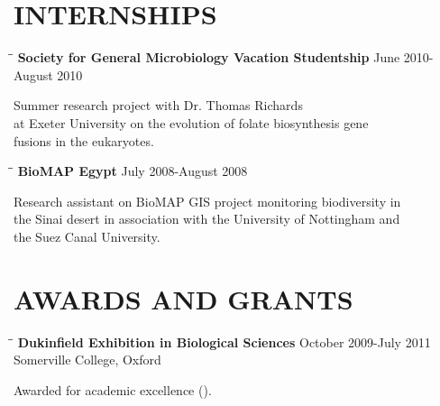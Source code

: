 \documentclass{res}
\begin{document}
\begin{resume}
\section{INTERNSHIPS}
   \vspace{-0.05in}  
      \begin{tabbing}
   \hspace{2in}\= \hspace{2.6in}\= \kill 
    {\bf Society for General Microbiology Vacation Studentship} \> \>        June 2010-August 2010\\
     \end{tabbing}\vspace{-30pt}      
Summer research project with Dr. Thomas Richards \\  at Exeter University on the evolution of folate biosynthesis gene \\fusions in the eukaryotes.

   \begin{tabbing}
   \hspace{2in}\= \hspace{2.6in}\= \kill 
    {\bf BioMAP Egypt} \> \>        July 2008-August 2008\\
     \end{tabbing}\vspace{-30pt}      
Research assistant on BioMAP GIS project monitoring biodiversity in \\the Sinai desert in association with the University of Nottingham and \\the Suez Canal University.

\section{AWARDS AND GRANTS}
   \vspace{-0.05in}  
   \begin{tabbing}
   \hspace{2in}\= \hspace{2.6in}\= \kill 
    {\bf Dukinfield Exhibition in Biological Sciences} \> \>        October 2009-July 2011\\
                                               
                                               \> \> Somerville College, Oxford \\
   \end{tabbing}\vspace{-40pt}     
   Awarded for academic excellence ().


\end{resume}
\end{document}
